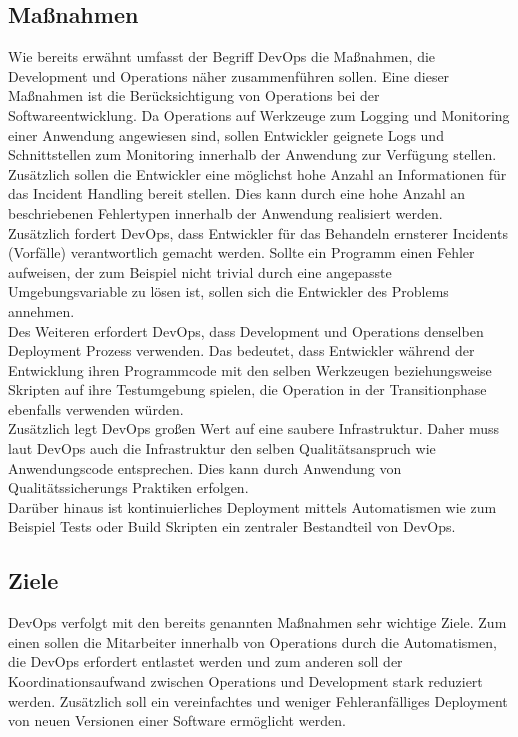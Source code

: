 \subsection{Maßnahmen}
Wie bereits erwähnt umfasst der Begriff DevOps die Maßnahmen, die Development und Operations näher zusammenführen sollen. Eine dieser Maßnahmen ist die Berücksichtigung von Operations bei der Softwareentwicklung. Da Operations auf Werkzeuge zum Logging und Monitoring einer Anwendung angewiesen sind, sollen Entwickler geignete Logs und Schnittstellen zum Monitoring innerhalb der Anwendung zur Verfügung stellen. Zusätzlich sollen die Entwickler eine möglichst hohe Anzahl an Informationen für das Incident Handling bereit stellen. Dies kann durch eine hohe Anzahl an beschriebenen Fehlertypen innerhalb der Anwendung realisiert werden. \\
Zusätzlich fordert DevOps, dass Entwickler für das Behandeln ernsterer Incidents (Vorfälle) verantwortlich gemacht werden. Sollte ein Programm einen Fehler aufweisen, der zum Beispiel nicht trivial durch eine angepasste Umgebungsvariable zu lösen ist, sollen sich die Entwickler des Problems annehmen. \\
Des Weiteren erfordert DevOps, dass Development und Operations denselben Deployment Prozess verwenden. Das bedeutet, dass Entwickler während der Entwicklung ihren Programmcode mit den selben Werkzeugen beziehungsweise Skripten auf ihre Testumgebung spielen, die Operation in der Transitionphase ebenfalls verwenden würden.\\
Zusätzlich legt DevOps großen Wert auf eine saubere Infrastruktur. Daher muss laut DevOps auch die Infrastruktur den selben Qualitätsanspruch wie Anwendungscode entsprechen. Dies kann durch Anwendung von Qualitätssicherungs Praktiken erfolgen. \\
Darüber hinaus ist kontinuierliches Deployment mittels Automatismen wie zum Beispiel Tests oder Build Skripten ein zentraler Bestandteil von DevOps.

\subsection{Ziele}
DevOps verfolgt mit den bereits genannten Maßnahmen sehr wichtige Ziele. Zum einen sollen die Mitarbeiter innerhalb von Operations durch die Automatismen, die DevOps erfordert entlastet werden und zum anderen soll der Koordinationsaufwand zwischen Operations und Development stark reduziert werden. Zusätzlich soll ein vereinfachtes und weniger Fehleranfälliges Deployment von neuen Versionen einer Software ermöglicht werden.
